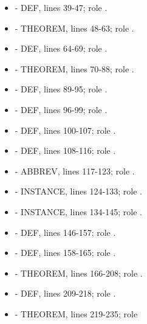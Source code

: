 \begin{itemize}
\tightlist
\item
  \texttt{\protect{}} - DEF, lines 39-47; role \texttt{\protect{}}.
\item
  \texttt{\protect{}} - THEOREM, lines 48-63;
  role \texttt{\protect{}}.
\item
  \texttt{\protect{}} - DEF, lines 64-69; role \texttt{\protect{}}.
\item
  \texttt{\protect{}} - THEOREM, lines 70-88;
  role \texttt{\protect{}}.
\item
  \texttt{\protect{}} - DEF, lines 89-95; role
  \texttt{\protect{}}.
\item
  \texttt{\protect{}} - DEF, lines 96-99; role \texttt{\protect{}}.
\item
  \texttt{\protect{}} - DEF, lines 100-107; role \texttt{\protect{}}.
\item
  \texttt{\protect{}} - DEF, lines 108-116; role \texttt{\protect{}}.
\item
  \texttt{\protect{}} - ABBREV, lines 117-123; role \texttt{\protect{}}.
\item
  \texttt{\protect{}} - INSTANCE, lines 124-133;
  role \texttt{\protect{}}.
\item
  \texttt{\protect{}} - INSTANCE, lines 134-145; role
  \texttt{\protect{}}.
\item
  \texttt{\protect{}} - DEF, lines 146-157; role \texttt{\protect{}}.
\item
  \texttt{\protect{}} - DEF, lines 158-165; role \texttt{\protect{}}.
\item
  \texttt{\protect{}} - THEOREM, lines 166-208; role
  \texttt{\protect{}}.
\item
  \texttt{\protect{}} - DEF, lines 209-218; role \texttt{\protect{}}.
\item
  \texttt{\protect{}} - THEOREM, lines 219-235; role

\end{itemize}
